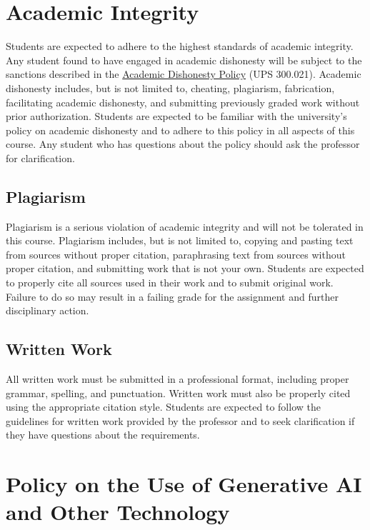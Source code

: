 \documentclass[11pt]{article}     %
\begin{document}
\section*{Academic Integrity}
Students are expected to adhere to the highest standards of academic integrity. Any student found to have engaged in academic dishonesty will be subject to the sanctions described in the \href{https://www.fullerton.edu/senate/publications_policies_resolutions/ups/UPS%20300/UPS%20300.021.pdf}{Academic Dishonesty Policy} (UPS 300.021). Academic dishonesty includes, but is not limited to, cheating, plagiarism, fabrication, facilitating academic dishonesty, and submitting previously graded work without prior authorization. Students are expected to be familiar with the university's policy on academic dishonesty and to adhere to this policy in all aspects of this course. Any student who has questions about the policy should ask the professor for clarification.

\subsection*{Plagiarism}
Plagiarism is a serious violation of academic integrity and will not be tolerated in this course. Plagiarism includes, but is not limited to, copying and pasting text from sources without proper citation, paraphrasing text from sources without proper citation, and submitting work that is not your own. Students are expected to properly cite all sources used in their work and to submit original work. Failure to do so may result in a failing grade for the assignment and further disciplinary action.

\subsection*{Written Work}
All written work must be submitted in a professional format, including proper grammar, spelling, and punctuation. Written work must also be properly cited using the appropriate citation style. Students are expected to follow the guidelines for written work provided by the professor and to seek clarification if they have questions about the requirements.

\section*{Policy on the Use of Generative AI and Other Technology}
\end{document}
